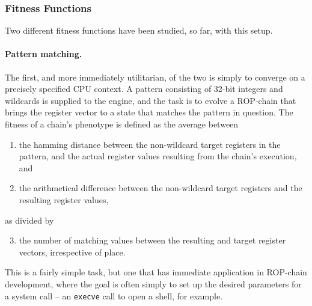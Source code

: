 \subsubsection{Fitness Functions}

Two different fitness functions have been studied, so far, with
this setup. 

\paragraph{Pattern matching.} The first, and more immediately
utilitarian, of the two is simply to converge on a precisely
specified CPU context. A pattern consisting of 32-bit
integers and wildcards is supplied to the engine, and the task is
to evolve a ROP-chain that brings the register vector to
a state that matches the pattern in question. The fitness of a
chain's phenotype is defined as the average between
{\small
\begin{enumerate}
   \item the hamming distance between the non-wildcard target
    registers in the pattern, and the actual register values
    resulting from the chain's execution, and
  
  \item the arithmetical difference between the non-wildcard
    target registers and the resulting register values,
\end{enumerate} 
}
as divided by 
{\small
\begin{enumerate}
    \setcounter{enumi}{2}
  \item the number of matching values between the resulting
and target register vectors, irrespective of place.
\end{enumerate}
}

This is a fairly simple task, but one that has immediate
application in ROP-chain development, where the goal is
often simply to set up the desired parameters for a system call
-- an \texttt{execve} call to open a shell, for example.

